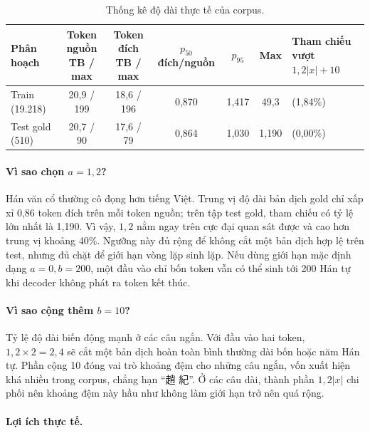 \documentclass[11pt]{article}
\begin{document}
\begin{table}[H]
  \centering
  \scriptsize
  \caption{Thống kê độ dài thực tế của corpus.}
  \label{tab:qa-fairseq-length}
  \begin{tabularx}{\linewidth}{@{}lccccc>{\raggedright\arraybackslash}X@{}}
    \toprule
    Phân hoạch
      & \shortstack{Token nguồn\\TB / max}
      & \shortstack{Token đích\\TB / max}
      & \shortstack{$p_{50}$\\đích/nguồn}
      & $p_{95}$
      & Max
      & Tham chiếu vượt $1{,}2|x|+10$ \\
    \midrule
    Train (19.218)
      & 20,9 / 199
      & 18,6 / 196
      & 0,870
      & 1,417
      & 49,3
      & 353 (1,84\%) \\
    Test gold (510)
      & 20,7 / 90
      & 17,6 / 79
      & 0,864
      & 1,030
      & 1,190
      & 0 (0,00\%) \\
    \bottomrule
  \end{tabularx}
\end{table}

\paragraph{Vì sao chọn $a=1{,}2$?}
Hán văn cổ thường cô đọng hơn tiếng Việt. Trung vị độ dài bản dịch gold chỉ
xấp xỉ 0,86 token đích trên mỗi token nguồn; trên tập test gold, tham chiếu có
tỷ lệ lớn nhất là 1,190. Vì vậy, $1{,}2$ nằm ngay trên cực đại quan sát được và
cao hơn trung vị khoảng 40\%. Ngưỡng này đủ rộng để không cắt một bản dịch hợp
lệ trên test, nhưng đủ chặt để giới hạn vòng lặp sinh lặp. Nếu dùng giới hạn
mặc định dạng $a=0,b=200$, một đầu vào chỉ bốn token vẫn có thể sinh tới 200
Hán tự khi decoder không phát ra token kết thúc.

\paragraph{Vì sao cộng thêm $b=10$?}
Tỷ lệ độ dài biến động mạnh ở các câu ngắn. Với đầu vào hai token,
$1{,}2\times2=2{,}4$ sẽ cắt một bản dịch hoàn toàn bình thường dài bốn hoặc năm
Hán tự. Phần cộng 10 đóng vai trò khoảng đệm cho những câu ngắn, vốn xuất hiện
khá nhiều trong corpus, chẳng hạn ``趙 紀''. Ở các câu dài, thành phần
$1{,}2|x|$ chi phối nên khoảng đệm này hầu như không làm giới hạn trở nên quá
rộng.

\paragraph{Lợi ích thực tế.}
\end{document}
